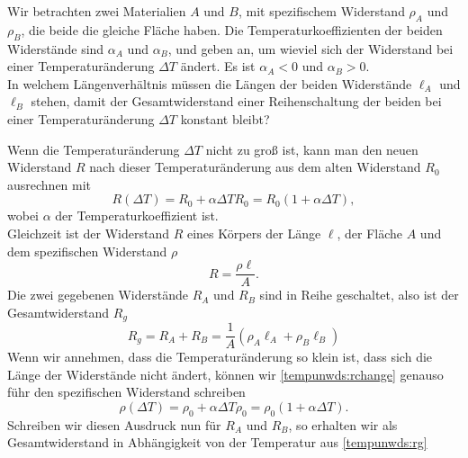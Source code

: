 \begin{Exercise}[label = tempind, title = Temperaturunabhängiger Widerstand, difficulty = 2, origin = Alte IPhO-Aufgabe ]
Wir betrachten zwei Materialien $A$ und $B$, mit spezifischem Widerstand $\rho_A$ und $\rho_B$, die beide die gleiche Fläche haben. Die Temperaturkoeffizienten der beiden Widerstände sind $\alpha_A$ und $\alpha_B$, und geben an, um wieviel sich der Widerstand bei einer Temperaturänderung $\Delta T$ ändert. Es ist $\alpha_A < 0$ und $\alpha_B > 0$. \\
In welchem Längenverhältnis müssen die Längen der beiden Widerstände $\ell_A$ und $\ell_B$ stehen, damit der Gesamtwiderstand einer Reihenschaltung der beiden bei einer Temperaturänderung $\Delta T$ konstant bleibt?
\end{Exercise}
\begin{Answer}[ref=tempind]
Wenn die Temperaturänderung $\Delta T$ nicht zu groß ist, kann man den neuen Widerstand $R$ nach dieser Temperaturänderung aus dem alten Widerstand $R_0$ ausrechnen mit
\begin{equation}\label{tempunwds:rchange}
	R\left(\Delta T\right) = R_0 + \alpha \Delta T R_0 = R_0\left(1+\alpha \Delta T\right),
\end{equation}
wobei $\alpha$ der Temperaturkoeffizient ist.\\
Gleichzeit ist der Widerstand $R$ eines Körpers der Länge $\ell$, der Fläche $A$ und dem spezifischen Widerstand $\rho$ 
\begin{equation}\label{tempunwds:rdef}
	R = \frac{\rho \ell}{A}.
\end{equation}
Die zwei gegebenen Widerstände $R_A$ und $R_B$ sind in Reihe geschaltet, also ist der Gesamtwiderstand $R_g$ 
\begin{equation}\label{tempunwds:rg}
	R_g = R_A + R_B =\frac{1}{A}\left(\rho_A \ell_A + \rho_B \ell_B\right) 
\end{equation}
Wenn wir annehmen, dass die Temperaturänderung so klein ist, dass sich die Länge der Widerstände nicht ändert, können wir \eqref{tempunwds:rchange} genauso führ den spezifischen Widerstand schreiben
\begin{equation}\label{tempunwds:rhochange}
	\rho\left(\Delta T\right) = \rho_0 + \alpha \Delta T \rho_0 = \rho_0\left(1+\alpha \Delta T\right).
\end{equation}
Schreiben wir diesen Ausdruck nun für $R_A$ und $R_B$, so erhalten wir als Gesamtwiderstand in Abhängigkeit von der Temperatur aus \eqref{tempunwds:rg}
\begin{equation*}

\end{equation*}
\end{Answer}
